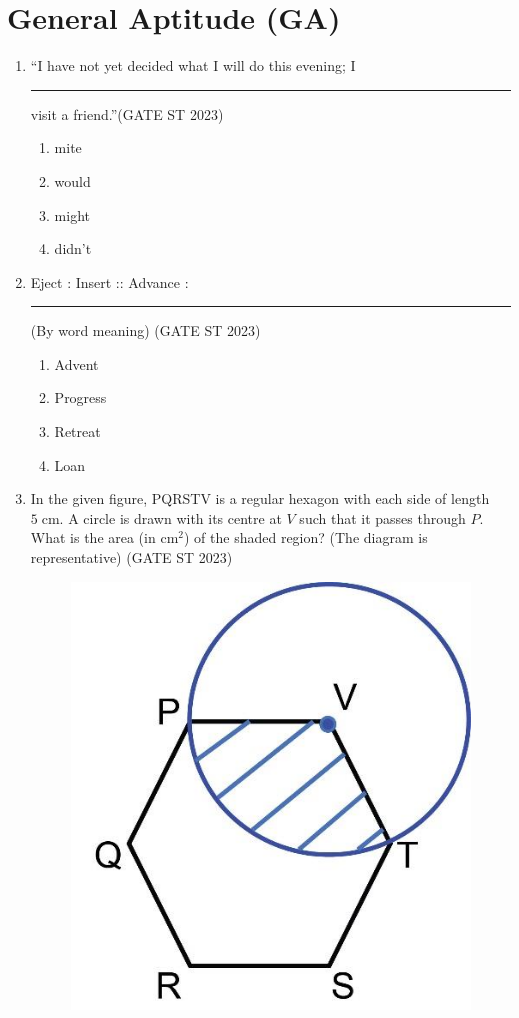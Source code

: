 \documentclass[journal]{IEEEtran}
\begin{document}
\section*{General Aptitude (GA)}
\begin{enumerate}[label=\textbf{Q.\arabic*.}, start=1, align=left, itemsep=2em]

\item ``I have not yet decided what I will do this evening; I \rule{2cm}{0.1pt} visit a friend.''\hfill(GATE ST 2023)
\begin{enumerate}
\item mite
\item would
\item might
\item didn't
\end{enumerate}


\item Eject : Insert :: Advance : \rule{2cm}{0.1pt}\newline
(By word meaning) \hfill(GATE ST 2023)
\begin{enumerate}
    \item Advent
    \item Progress
    \item Retreat
    \item Loan
\end{enumerate}

\item In the given figure, PQRSTV is a regular hexagon with each side of length $5\;\mathrm{cm}$. A circle is drawn with its centre at $V$ such that it passes through $P$. What is the area (in $\mathrm{cm}^2$) of the shaded region? (The diagram is representative) \hfill(GATE ST 2023)
 \begin{figure}[H]
     \centering
     \includegraphics[width=0.5\columnwidth]{figs/Q.3image.png}
     \caption{}
     \label{fig:placeholder}
 \end{figure}
        

\end{enumerate}
\end{document}
